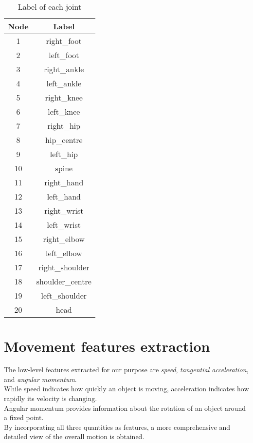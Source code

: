 \begin{table}[H]
  \centering
  \begin{tabular}{|c|c|}
      \hline
      \textbf{Node} & \textbf{Label} \\
      \hline
      1 & right\_foot \\
      2 & left\_foot \\
      3 & right\_ankle \\
      4 & left\_ankle \\
      5 & right\_knee \\
      6 & left\_knee \\
      7 & right\_hip \\
      8 & hip\_centre \\
      9 & left\_hip \\
      10 & spine \\
      11 & right\_hand \\
      12 & left\_hand \\
      13 & right\_wrist \\
      14 & left\_wrist \\
      15 & right\_elbow \\
      16 & left\_elbow \\
      17 & right\_shoulder \\
      18 & shoulder\_centre \\
      19 & left\_shoulder \\
      20 & head \\
      \hline
  \end{tabular}
  \caption{Label of each joint}
  \label{tab:labels_joints}
\end{table}


\section{Movement features extraction}
The low-level features extracted for our purpose are \textit{speed}, \textit{tangential acceleration}, and \textit{angular momentum}. \\
While speed indicates how quickly an object is moving, acceleration indicates how rapidly its velocity is changing.\\
Angular momentum provides information about the rotation of an object around a fixed point.\\
By incorporating all three quantities as features, a more comprehensive and detailed view of the overall motion is obtained.

